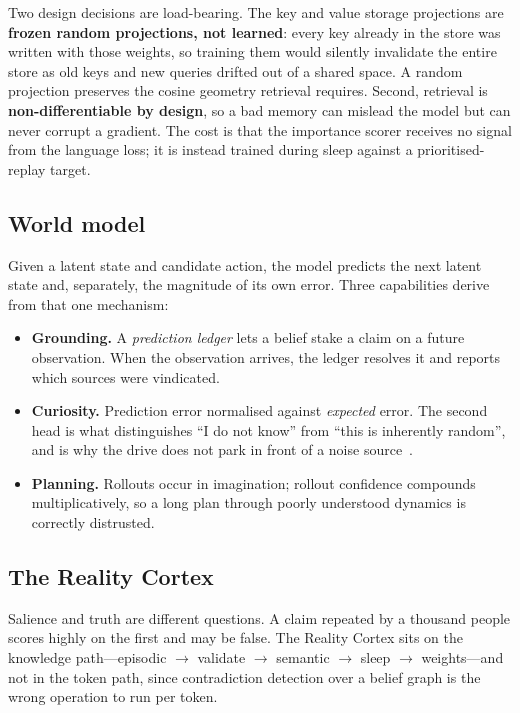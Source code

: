 \documentclass[10pt,twocolumn]{article}
\begin{document}
Two design decisions are load-bearing. The key and value storage projections
are \textbf{frozen random projections, not learned}: every key already in the
store was written with those weights, so training them would silently
invalidate the entire store as old keys and new queries drifted out of a shared
space. A random projection preserves the cosine geometry retrieval requires.
Second, retrieval is \textbf{non-differentiable by design}, so a bad memory can
mislead the model but can never corrupt a gradient. The cost is that the
importance scorer receives no signal from the language loss; it is instead
trained during sleep against a prioritised-replay target.

\subsection{World model}

Given a latent state and candidate action, the model predicts the next latent
state and, separately, the magnitude of its own error. Three capabilities
derive from that one mechanism:

\begin{itemize}\itemsep1pt
  \item \textbf{Grounding.} A \emph{prediction ledger} lets a belief stake a
        claim on a future observation. When the observation arrives, the ledger
        resolves it and reports which sources were vindicated.
  \item \textbf{Curiosity.} Prediction error normalised against \emph{expected}
        error. The second head is what distinguishes ``I do not know'' from
        ``this is inherently random'', and is why the drive does not park in
        front of a noise source~\cite{burda2019}.
  \item \textbf{Planning.} Rollouts occur in imagination; rollout confidence
        compounds multiplicatively, so a long plan through poorly understood
        dynamics is correctly distrusted.
\end{itemize}

\subsection{The Reality Cortex}

Salience and truth are different questions. A claim repeated by a thousand
people scores highly on the first and may be false. The Reality Cortex sits on
the knowledge path---episodic $\rightarrow$ validate $\rightarrow$ semantic
$\rightarrow$ sleep $\rightarrow$ weights---and not in the token path, since
contradiction detection over a belief graph is the wrong operation to run per
token.
\end{document}
